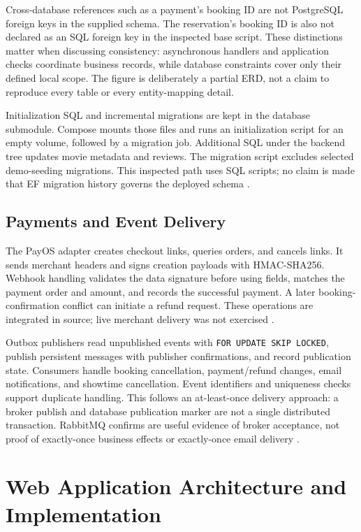 \documentclass[conference]{IEEEtran}
\newcommand{\code}[1]{\texttt{#1}}
\begin{document}
Cross-database references such as a payment's booking ID are not PostgreSQL
foreign keys in the supplied schema. The reservation's booking ID is also not
declared as an SQL foreign key in the inspected base script. These distinctions
matter when discussing consistency: asynchronous handlers and application checks
coordinate business records, while database constraints cover only their
defined local scope. The figure is deliberately a partial ERD, not a claim to
reproduce every table or every entity-mapping detail.

Initialization SQL and incremental migrations are kept in the database
submodule. Compose mounts those files and runs an initialization script for
an empty volume, followed by a migration job. Additional SQL under the backend
tree updates movie metadata and reviews. The migration script excludes selected
demo-seeding migrations. This inspected path uses SQL scripts; no claim is made
that EF migration history governs the deployed schema \cite{deployment,db}.

\subsection{Payments and Event Delivery}
The PayOS adapter creates checkout links, queries orders, and cancels links.
It sends merchant headers and signs creation payloads with HMAC-SHA256.
Webhook handling validates the data signature before using fields, matches
the payment order and amount, and records the successful payment. A later
booking-confirmation conflict can initiate a refund request. These operations
are integrated in source; live merchant delivery was not exercised
\cite{booking,payos}.

Outbox publishers read unpublished events with \code{FOR UPDATE SKIP LOCKED},
publish persistent messages with publisher confirmations, and record publication
state. Consumers handle booking cancellation, payment/refund changes, email
notifications, and showtime cancellation. Event identifiers and uniqueness checks
support duplicate handling. This follows an at-least-once delivery approach:
a broker publish and database publication marker are not a single distributed
transaction. RabbitMQ confirms are useful evidence of broker acceptance, not
proof of exactly-once business effects or exactly-once email delivery
\cite{booking,rabbit}.

\section{Web Application Architecture and Implementation}
\end{document}
